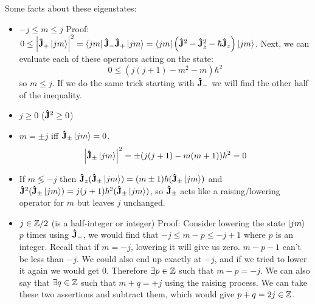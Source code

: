\documentclass[a4paper,twoside,master.tex]{subfiles}
\begin{document}
Some facts about these eigenstates:
\begin{itemize}
    \item $ -j \leq m \leq j $
        Proof: $ 0 \leq \abs{ \vu{J}_+\ket{jm}}^2 =\bra{jm} \vu{J}_- \vu{J}_+\ket{jm} =\bra{jm} \left( \vu{J}^2 - \vu{J}^2_z - \hbar \vu{J}_z \right)\ket{jm} $. Next, we can evaluate each of these operators acting on the state:
        \begin{equation}
            0 \leq (j(j+1) - m^2 - m) \hbar^2
        \end{equation}
        so $ m \leq j $. If we do the same trick starting with $ \vu{J}_- $ we will find the other half of the inequality.
    \item $ j \geq 0 $
        ($ \vu{J}^2 \geq 0 $)
    \item $ m = \pm j $ iff $ \vu{J}_{\pm}\ket{jm} = 0 $.
        \begin{equation}
            \abs{ \vu{J}_{\pm}\ket{jm}}^2 = \pm(j(j+1) - m(m+1)) \hbar^2 = 0
        \end{equation}
    \item If $ m \lessgtr -j $ then $ \vu{J}_z ( \vu{J}_{\pm}\ket{jm}) = (m\pm1) \hbar ( \vu{J}_{\pm}\ket{jm}) $ and $ \vu{J}^2 ( \vu{J}_{\pm}\ket{jm}) = j(j+1) \hbar^2 ( \vu{J}_{\pm}\ket{jm}) $, so $ \vu{J}_{\pm} $ acts like a raising/lowering operator for $ m $ but leaves $ j $ unchanged.
    \item $ j \in \mathbb{Z} / 2 $ (is a half-integer or integer)
        Proof: Consider lowering the state $\ket{jm} $ $ p $ times using $ \vu{J}_- $, we would find that $ -j \leq m - p \leq - j + 1 $ where $ p $ is an integer. Recall that if $ m = -j $, lowering it will give us zero. $ m - p - 1 $ can't be less than $ -j $. We could also end up exactly at $ -j $, and if we tried to lower it again we would get $ 0 $. Therefore $ \exists p \in \mathbb{Z} $ such that $ m - p = -j $. We can also say that $ \exists q \in \mathbb{Z} $ such that $ m + q = +j $ using the raising process. We can take these two assertions and subtract them, which would give $ p + q = 2j \in \mathbb{Z} $.
\end{itemize}
\end{document}

